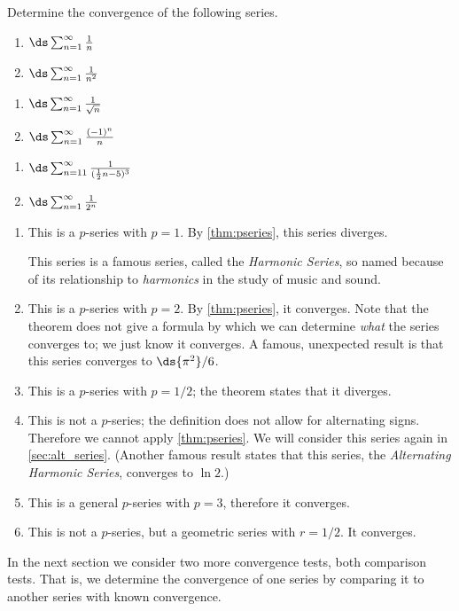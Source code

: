 {Determine the convergence of the following series.\\

\noindent\begin{minipage}[t]{.33\linewidth}
\begin{enumerate}
\item		$\ds\sum_{n=1}^\infty \frac{1}{n}$
\item		$\ds\sum_{n=1}^\infty \frac{1}{n^2}$
\end{enumerate}
\end{minipage}%
\begin{minipage}[t]{.33\linewidth}
\begin{enumerate}\addtocounter{enumi}{2}
\item		$\ds\sum_{n=1}^\infty \frac{1}{\sqrt{n}}$
\item		$\ds\sum_{n=1}^\infty \frac{(-1)^n}{n}$
\end{enumerate}
\end{minipage}%
\begin{minipage}[t]{.33\linewidth}
\begin{enumerate}\addtocounter{enumi}{4}
\item		$\ds\sum_{n=11}^\infty \frac{1}{(\frac12n-5)^3}$
\item		$\ds\sum_{n=1}^\infty \frac{1}{2^n}$
\end{enumerate}
\end{minipage}
}
{\begin{enumerate}
\item	This is a $p$-series with $p=1$. By \autoref{thm:pseries}, this series diverges.

This series is a famous series, called the \emph{Harmonic Series}, so named because of its relationship to \emph{harmonics} in the study of music and sound. 

\item	This is a $p$-series with $p=2$. By \autoref{thm:pseries}, it converges. Note that the theorem does not give a formula by which we can determine \emph{what} the series converges to; we just know it converges. A famous, unexpected result is that this series converges to $\ds{\pi^2}/{6}$.

\item	This is a $p$-series with $p=1/2$; the theorem states that it diverges.

\item	This is not a $p$-series; the definition does not allow for alternating signs. Therefore we cannot apply \autoref{thm:pseries}. We will consider this series again in \autoref{sec:alt_series}.
(Another famous result states that this series, the \emph{Alternating Harmonic Series}, converges to $\ln 2$.)

\item	This is a general $p$-series with $p=3$, therefore it converges.

\item	This is not a $p$-series, but a geometric series with $r=1/2$. It converges.
\eoehere
\end{enumerate}}

In the next section we consider two more convergence tests, both comparison tests. That is, we determine the convergence of one series by  comparing it to another series with known convergence. 

